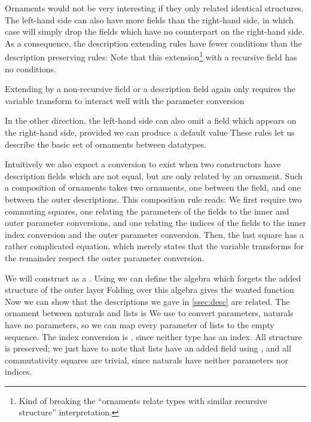 Ornaments would not be very interesting if they only related identical structures. The left-hand side can also have more fields than the right-hand side, in which case  will simply drop the fields which have no counterpart on the right-hand side. As a consequence, the description extending rules have fewer conditions than the description preserving rules: 
Note that this extension\footnote{Kind of breaking the ``ornaments relate types with similar recursive structure'' interpretation.} with a recursive field has no conditions.

Extending by a non-recursive field or a description field again only requires the variable transform to interact well with the parameter conversion

In the other direction, the left-hand side can also omit a field which appears on the right-hand side, provided we can produce a default value
These rules let us describe the basic set of ornaments between datatypes.

Intuitively we also expect a conversion to exist when two constructors have description fields which are not equal, but are only related by an ornament. Such a composition of ornaments takes two ornaments, one between the field, and one between the outer descriptions. This composition rule reads:
We first require two commuting squares, one relating the parameters of the fields to the inner and outer parameter conversions, and one relating the indices of the fields to the inner index conversion and the outer parameter conversion. Then, the last square has a rather complicated equation, which merely states that the variable transforms for the remainder respect the outer parameter conversion.

We will construct  as a . Using
we can define the algebra which forgets the added structure of the outer layer
Folding over this algebra gives the wanted function
Now we can show that the descriptions we gave in \autoref{ssec:desc} are related. The ornament between naturals and lists is
We use \AgdaFunction{!} to convert parameters, naturals have no parameters, so we can map every parameter of lists to the empty sequence. The index conversion is , since neither type has an index. All structure is preserved; we just have to note that lists have an added field using , and all commutativity squares are trivial, since naturals have neither parameters nor indices.


